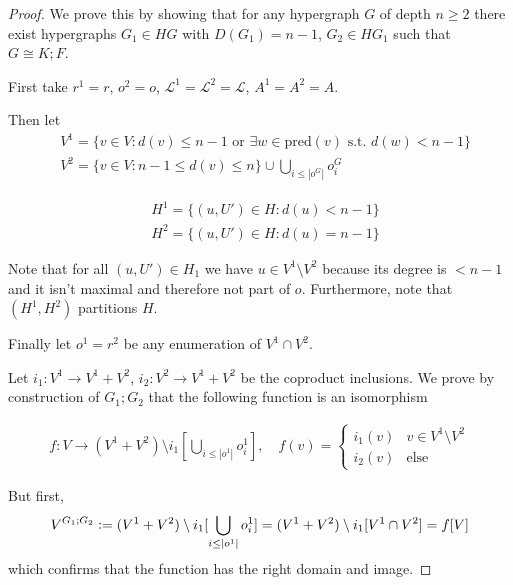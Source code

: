 \documentclass[12pt]{article}
\theoremstyle{definition}
\newcommand{\defeq}{\vcentcolon=}
\newcommand{\1}{\mathbbm{1}}
\renewcommand{\L}{\mathcal{L}}
\newcommand{\seq}{;}
\newcommand{\pred}{\text{pred}}
\begin{document}
\begin{proof}
    We prove this by showing that for any hypergraph $G$ of depth $n \geq 2$ there exist hypergraphs $G_{1}\in HG$ with $D(G_1) = n-1$, $G_{2}\in HG_1$ such that $G \cong K\seq F$.

    First take $r^{1} = r$, $o^{2} = o$, $\L^{1} = \L^{2} = \L$, $A^{1} = A^{2} = A$.

    Then let
    \begin{align*}
        &V^1 = \{v\in V : d(v) \leq n-1 \text{ or } \exists w\in \pred(v) \text{ s.t. } d(w) < n-1\}\\
        &V^2 = \{v\in V : n-1 \leq d(v) \leq n\} \cup \bigcup_{i\leq |o^G|} o^G_i
    \end{align*}

    \begin{align*}
        &H^1 = \{(u,U')\in H : d(u) < n-1\}\\
        &H^2 = \{(u, U')\in H : d(u) = n-1\}
    \end{align*}

    Note that for all $(u,U') \in H_1$ we have $u\in V^1\setminus V^2$ because its degree is $< n-1$ and it isn't maximal and therefore not part of $o$. Furthermore, note that $(H^1, H^2)$ partitions $H$.

    Finally let $o^1 = r^2$ be any enumeration of $V^1\cap V^2$. 

    Let $i_1: V^1\to V^1 + V^2$, $i_2: V^2\to V^1 + V^2$ be the coproduct inclusions. We prove by construction of $G_1;G_2$ that the following function is an isomorphism

    \begin{align*}
        f: V\to (V^1 + V^2)\setminus i_1[\bigcup_{i\leq |o^1|}o^1_i], \quad f(v) = \begin{cases}
            i_1(v) & v\in V^1\setminus V^2\\
            i_2(v) & \text{else}
        \end{cases}
    \end{align*}

    But first,
    \begin{align*}
        V^{G_1;G_2} \defeq (V^1 + V^2) \setminus i_1[\bigcup_{i\leq |o^1|}o^1_i] = (V^1 + V^2) \setminus i_1[V^1\cap V^2] = f[V]
    \end{align*}
    which confirms that the function has the right domain and image.    


\end{proof}
\end{document}
